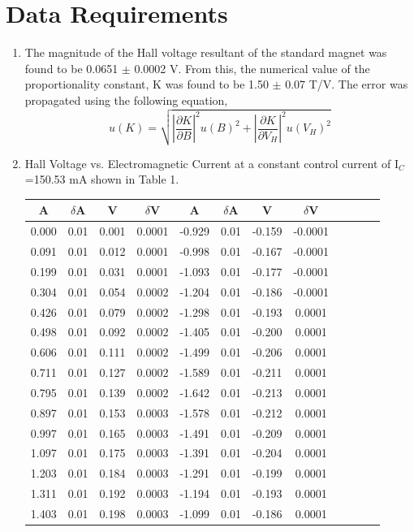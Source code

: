 \section{Data Requirements}
\begin{enumerate}[resume]
\item The magnitude of the Hall voltage resultant of the standard magnet was found to be 0.0651 $\pm$ 0.0002 V. From this, the numerical value of the proportionality constant, K was found to be 1.50 $\pm$ 0.07 T/V. The error was propagated using the following equation,
$$
u(K)=\sqrt{\left| \frac{\partial K}{\partial B}   \right|^2u(B)^2+\left| \frac{\partial K}{\partial V_H}  \right|^2u(V_H)^2}
$$
\item Hall Voltage vs. Electromagnetic Current at a constant control current of I$_C$=150.53 mA shown in Table 1.
  \begin{table}[h]
    \center
    \begin{tabular}{|c|c|c|c|c|c|c|c|c|c|c|c|}
      \hline
      A & $\delta$A & V & $\delta$V & A & $\delta$A & V & $\delta$V\\
      \hline
      0.000&0.01&0.001&0.0001&-0.929&0.01&-0.159&-0.0001\\
      0.091&0.01&0.012&0.0001&-0.998&0.01&-0.167&-0.0001\\
      0.199&0.01&0.031&0.0001&-1.093&0.01&-0.177&-0.0001\\
      0.304&0.01&0.054&0.0002&-1.204&0.01&-0.186&-0.0001\\
      0.426&0.01&0.079&0.0002&-1.298&0.01&-0.193&0.0001\\
      0.498&0.01&0.092&0.0002&-1.405&0.01&-0.200&0.0001\\
      0.606&0.01&0.111&0.0002&-1.499&0.01&-0.206&0.0001\\
      0.711&0.01&0.127&0.0002&-1.589&0.01&-0.211&0.0001\\
      0.795&0.01&0.139&0.0002&-1.642&0.01&-0.213&0.0001\\
      0.897&0.01&0.153&0.0003&-1.578&0.01&-0.212&0.0001\\
      0.997&0.01&0.165&0.0003&-1.491&0.01&-0.209&0.0001\\
      1.097&0.01&0.175&0.0003&-1.391&0.01&-0.204&0.0001\\
      1.203&0.01&0.184&0.0003&-1.291&0.01&-0.199&0.0001\\
      1.311&0.01&0.192&0.0003&-1.194&0.01&-0.193&0.0001\\
      1.403&0.01&0.198&0.0003&-1.099&0.01&-0.186&0.0001\\

\end{tabular}
\end{table}
\end{enumerate}
